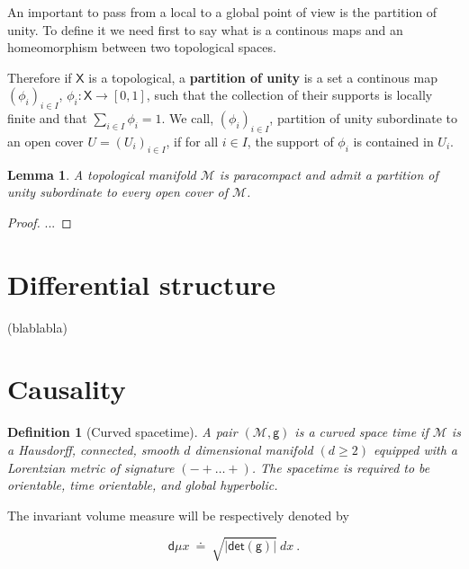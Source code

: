 \documentclass[11pt]{book}
\newcommand{\abs}[1]{\left|#1\right|}
\renewcommand{\det}{\mathsf{det}}
\newcommand{\Mcal}{\mathcal{M}}
\newcommand{\Xsf}{\mathsf{X}}
\newcommand{\dsf}{\mathsf{d}}
\newcommand{\gsf}{\mathsf{g}}
\theoremstyle{break}
\newtheorem{lemma}{Lemma}
\newtheorem{definition}{Definition}
\newtheorem{proof}{Proof}
\begin{document}
An important to pass from a local to a global point of view is the partition of unity. To define it we need first to say what is a continous maps and an homeomorphism between two topological spaces.




Therefore if $\Xsf$ is a topological, a \textbf{partition of unity} is a set a continous map $(\phi_i)_{i \in I}$, $\phi_i : \Xsf \to [0,1]$, such that the collection of their supports is locally finite and that $\sum_{i\in I} \phi_i = 1$. We call, $(\phi_i)_{i \in I}$, partition of unity subordinate to an open cover $U=(U_i)_{i \in I}$, if for all $i \in I$, the support of $\phi_i$ is contained in $U_i$.


\begin{lemma}
A topological manifold $\Mcal$ is paracompact and admit a partition of unity subordinate to every open cover of $\Mcal$.
\end{lemma}


\begin{proof}
...
\end{proof}


\section{Differential structure}

(blablabla)

\section{Causality}


\begin{definition}[Curved spacetime]
A pair $(\Mcal,\gsf)$ is a curved space time if $\Mcal$ is a Hausdorff, connected, smooth $d$ dimensional manifold $(d \geq 2)$ equipped with a Lorentzian metric of signature $( - + \dots +)$. The spacetime is required to be orientable, time orientable, and global hyperbolic. 
\end{definition}

The invariant volume measure will be respectively denoted by  

\begin{equation*} 
 \dsf\mu x \ \doteq \ \sqrt{\abs{\det(\gsf)}} \ dx \ .
\end{equation*}
\end{document}
